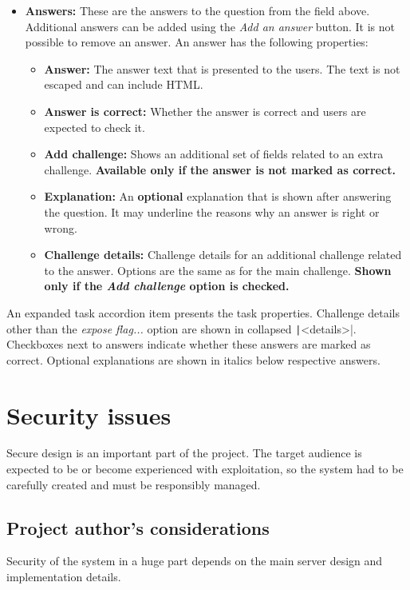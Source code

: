 \begin{itemize}
    \item \textbf{Answers:} These are the answers to the question from the field above. Additional answers can be added using the \textit{Add an answer} button. It is not possible to remove an answer. An answer has the following properties:
    \begin{itemize}
        \item \textbf{Answer:} The answer text that is presented to the users. The text is not escaped and can include HTML.
        \item \textbf{Answer is correct:} Whether the answer is correct and users are expected to check it.
        \item \textbf{Add challenge:} Shows an additional set of fields related to an extra challenge. \textbf{Available only if the answer is not marked as correct.}
        \item \textbf{Explanation:} An \textbf{optional} explanation that is shown after answering the question. It may underline the reasons why an answer is right or wrong.
        \item \textbf{Challenge details:} Challenge details for an additional challenge related to the answer. Options are the same as for the main challenge. \textbf{Shown only if the \textit{Add challenge} option is checked.}
    \end{itemize}
\end{itemize}

An expanded task accordion item presents the task properties. Challenge details other than the \textit{expose flag...} option are shown in collapsed \texttt|<details>|. Checkboxes next to answers indicate whether these answers are marked as correct. Optional explanations are shown in italics below respective answers.

\section{Security issues}

Secure design is an important part of the project. The target audience is expected to be or become experienced with exploitation, so the system had to be carefully created and must be responsibly managed.

\subsection{Project author's considerations}

Security of the system in a huge part depends on the main server design and implementation details.

